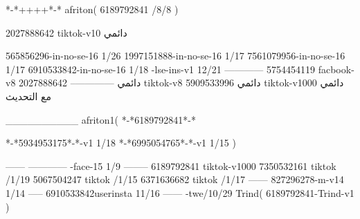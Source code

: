 *-*++++*-*
afriton(
6189792841 /8/8
)

2027888642 tiktok-v10
دائمي

565856296-in-no-se-16 1/26
1997151888-in-no-se-16 1/17
7561079956-in-no-se-16 1/17
6910533842-in-no-se-16 1/18
-lse-ins-v1 12/21
------------
5754454119 facbook-v8
دائمي
--------------
2027888642 tiktok-v8
دائمي
5909533996 tiktok-v1000
دائمي مع التحديث

__________
afriton1(
*-*6189792841*-*


*-*5934953175*-*-v1 1/18
*-*6995054765*-*-v1 1/15
)

------
------------
-face-15 1/9
--------
6189792841 tiktok-v1000
7350532161 tiktok /1/19
5067504247 tiktok /1/15
6371636682 tiktok /1/17
------
827296278-m-v14 1/14
-----
6910533842userinsta 11/16
------
-twe/10/29
Trind(
6189792841-Trind-v1 
)

